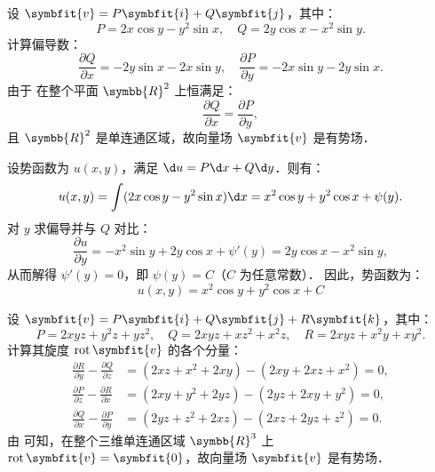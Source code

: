 \begin{solution}

    设 $\symbfit{v} = P \symbfit{i} + Q \symbfit{j}$，其中：
    \begin{equation}
        P = 2x \cos y - y^2 \sin x, \quad Q = 2y \cos x - x^2 \sin y.
    \end{equation}
    计算偏导数：
    \begin{equation}
        \label{eq:part-deriv-1}
        \frac{\partial Q}{\partial x} = -2y \sin x - 2x \sin y, \quad \frac{\partial P}{\partial y} = -2x \sin y - 2y \sin x.
    \end{equation}
    由于  在整个平面 $\symbb{R}^2$ 上恒满足：
    \begin{equation}
        \frac{\partial Q}{\partial x} = \frac{\partial P}{\partial y},
    \end{equation}
    且 $\symbb{R}^2$ 是单连通区域，故向量场 $\symbfit{v}$ 是有势场．

    设势函数为 $u(x, y)$，满足 $\d u = P \d x + Q \d y$．则有：
    \begin{equation}
        u(x, y) = \int (2x \cos y - y^2 \sin x) \d x = x^2 \cos y + y^2 \cos x + \psi(y).
    \end{equation}
    对 $y$ 求偏导并与 $Q$ 对比：
    \begin{equation}
        \frac{\partial u}{\partial y} = -x^2 \sin y + 2y \cos x + \psi'(y) = 2y \cos x - x^2 \sin y,
    \end{equation}
    从而解得 $\psi'(y) = 0$，即 $\psi(y) = C$（$C$ 为任意常数）．
    因此，势函数为：
    \begin{equation}
        \boxed{u(x, y) = x^2 \cos y + y^2 \cos x + C}
    \end{equation}


    设 $\symbfit{v} = P \symbfit{i} + Q \symbfit{j} + R \symbfit{k}$，其中：
    \begin{equation}
        P = 2xyz + y^2z + yz^2, \quad Q = 2xyz + xz^2 + x^2z, \quad R = 2xyz + x^2y + xy^2.
    \end{equation}
    计算其旋度 $\operatorname{rot} \symbfit{v}$ 的各个分量：
    \begin{equation}
        \label{eq:curl-comp-2}
        \begin{aligned}
            \frac{\partial R}{\partial y} - \frac{\partial Q}{\partial z} & = (2xz + x^2 + 2xy) - (2xy + 2xz + x^2) = 0, \\
            \frac{\partial P}{\partial z} - \frac{\partial R}{\partial x} & = (2xy + y^2 + 2yz) - (2yz + 2xy + y^2) = 0, \\
            \frac{\partial Q}{\partial x} - \frac{\partial P}{\partial y} & = (2yz + z^2 + 2xz) - (2xz + 2yz + z^2) = 0.
        \end{aligned}
    \end{equation}
    由  可知，在整个三维单连通区域 $\symbb{R}^3$ 上 $\operatorname{rot} \symbfit{v} = \symbfit{0}$，故向量场 $\symbfit{v}$ 是有势场．


\end{solution}
